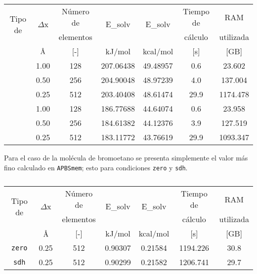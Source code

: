 \documentclass[12pt, oneside, numbers, spanish]{ezthesis}
\numberwithin{equation}{section}
\newcommand{\angstrom}{\text{\normalfont\AA}}
\begin{document}
\begin{table}[H]
	\centering
	\caption{}
	\def\arraystretch{0.8}
	\begin{tabular}{|c|cccccc|}\hline
		\multirow{2}{*}{Tipo de} & \multirow{2}{*}{$\Delta$x} & Número de & \multirow{2}{*}{E\_solv} & \multirow{2}{*}{E\_solv} & Tiempo de & RAM\\
		\multirow{2}{*}{condición} &  & elementos &  &  & cálculo & utilizada\\\cline{2-7}
		&  $\angstrom$ & [-] & kJ/mol & kcal/mol & [s] & [GB] \\\hline
		\parbox[t]{2mm}{} & 1.00 & 128 & 207.06438 & 49.48957 & 0.6 & 23.602 \\
		& 0.50 & 256 & 204.90048 & 48.97239 & 4.0 & 137.004 \\
		& 0.25 & 512 & 203.40408 & 48.61474 & 29.9 & 1174.478 \\ \hline
		\parbox[t]{2mm}{} & 1.00 & 128 & 186.77688 & 44.64074 & 0.6 & 23.958 \\
		& 0.50 & 256 & 184.61382 & 44.12376 & 3.9 & 127.519 \\
		& 0.25 & 512 & 183.11772 & 43.76619 & 29.9 & 1093.347 \\ \hline
	\end{tabular}\label{table:apbs_3q}
\end{table}

Para el caso de la molécula de bromoetano se presenta simplemente el valor más fino calculado en \texttt{APBSmem}; esto para condiciones \texttt{zero} y \texttt{sdh}.

\begin{table}[H]
	\centering
	\caption{}
	\def\arraystretch{0.8}
	\begin{tabular}{|c|cccccc|}\hline
		\multirow{2}{*}{Tipo de} & \multirow{2}{*}{$\Delta$x} & Número de & \multirow{2}{*}{E\_solv} & \multirow{2}{*}{E\_solv} & Tiempo de & RAM\\
		\multirow{2}{*}{condición} &  & elementos &  &  & cálculo & utilizada\\\cline{2-7}
		&  $\angstrom$ & [-] & kJ/mol & kcal/mol & [s] & [GB] \\\hline
	\texttt{zero} & 0.25 & 512 & 0.90307 & 0.21584 & 1194.226 & 30.8 \\
	\texttt{sdh} & 0.25 & 512 & 0.90299 & 0.21582 & 1206.741 & 29.7 \\ \hline
	\end{tabular}\label{table:apbs_brom}
\end{table}
\end{document}

